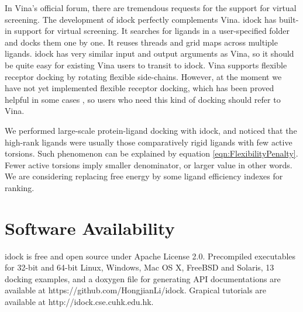 In Vina's official forum, there are tremendous requests for the support for virtual screening. The development of idock perfectly complements Vina. idock has built-in support for virtual screening. It searches for ligands in a user-specified folder and docks them one by one. It reuses threads and grid maps across multiple ligands. idock has very similar input and output arguments as Vina, so it should be quite easy for existing Vina users to transit to idock. Vina supports flexible receptor docking by rotating flexible side-chains. However, at the moment we have not yet implemented flexible receptor docking, which has been proved helpful in some cases \citep{1084}, so users who need this kind of docking should refer to Vina.

We performed large-scale protein-ligand docking with idock, and noticed that the high-rank ligands were usually those comparatively rigid ligands with few active torsions. Such phenomenon can be explained by equation \eqref{eqn:FlexibilityPenalty}. Fewer active torsions imply smaller denominator, or larger value in other words. We are considering replacing free energy by some ligand efficiency indexes \citep{335,336,337} for ranking.

\section{Software Availability}

idock is free and open source under Apache License 2.0. Precompiled executables for 32-bit and 64-bit Linux, Windows, Mac OS X, FreeBSD and Solaris, 13 docking examples, and a doxygen file for generating API documentations are available at https://github.com/HongjianLi/idock. Grapical tutorials are available at http://idock.cse.cuhk.edu.hk.

\chapterend

